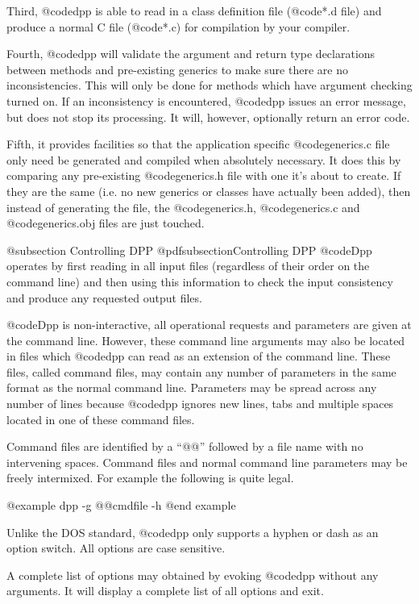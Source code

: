 Third, @code{dpp} is able to read in a class definition file
(@code{*.d} file) and produce a normal C file (@code{*.c})
for compilation by your compiler.

Fourth, @code{dpp} will validate the argument and return type
declarations between methods and pre-existing generics to make sure
there are no inconsistencies.  This will only be done for methods which
have argument checking turned on.  If an inconsistency is encountered,
@code{dpp} issues an error message, but does not stop its processing.
It will, however, optionally return an error code.

Fifth, it provides facilities so that the application specific
@code{generics.c} file only need be generated and compiled when
absolutely necessary.  It does this by comparing any pre-existing
@code{generics.h} file with one it's about to create.  If they are the
same (i.e. no new generics or classes have actually been added), then
instead of generating the file, the @code{generics.h}, @code{generics.c}
and @code{generics.obj} files are just touched.


@subsection Controlling DPP
@pdfsubsection{Controlling DPP}
@code{Dpp} operates by first reading in all input files (regardless
of their order on the command line) and then using this information
to check the input consistency and produce any requested output files.

@code{Dpp} is non-interactive, all operational requests and parameters
are given at the command line.  However, these command line arguments
may also be located in files which @code{dpp} can read as an extension
of the command line.  These files, called command files, may contain
any number of parameters in the same format as the normal command line.
Parameters may be spread across any number of lines because @code{dpp}
ignores new lines, tabs and multiple spaces located in one of these
command files.

Command files are identified by a ``@@'' followed by a file name with
no intervening spaces.  Command files and normal command line
parameters may be freely intermixed.  For example the following
is quite legal.

@example
        dpp -g @@cmdfile -h
@end example

Unlike the DOS standard, @code{dpp} only supports a hyphen or dash
as an option switch.  All options are case sensitive.

A complete list of options may obtained by evoking @code{dpp} without
any arguments.  It will display a complete list of all options and
exit.

